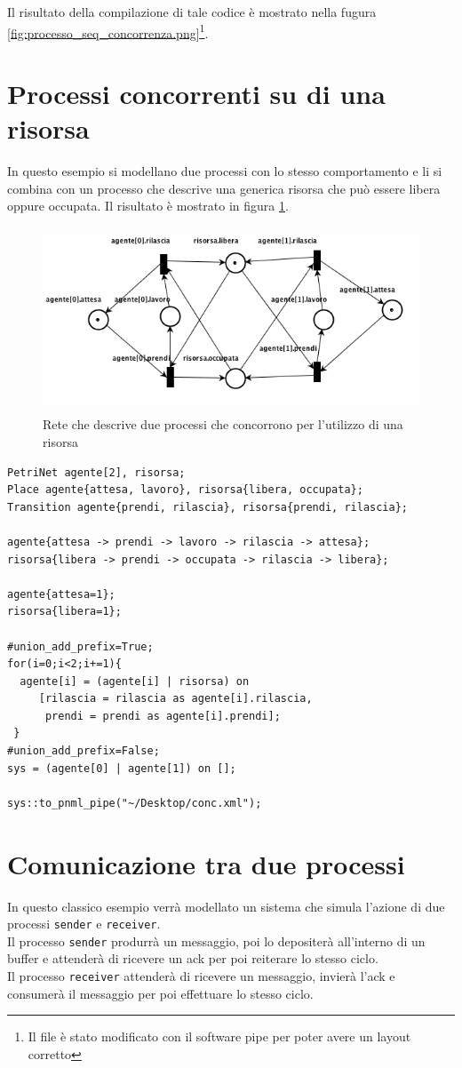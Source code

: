 \documentclass[italian,12pt]{book}
\begin{document}
Il risultato della compilazione di tale codice è mostrato nella fugura \ref{fig:processo_seq_concorrenza.png}\footnote{Il file è stato modificato con il software pipe per poter avere un layout corretto}.

\section{Processi concorrenti su di una risorsa}
In questo esempio si modellano due processi con lo stesso comportamento e li si combina con un processo che descrive una generica risorsa che può essere libera oppure occupata. Il risultato è mostrato in figura \ref{fig:processi_concorrenti_su_risorsa.png}.
\begin{figure}[htb]
\centerline{\includegraphics[height=5.5cm]{img/processi_concorrenti_su_risorsa.png}}
\caption{Rete che descrive due processi che concorrono per l'utilizzo di una risorsa}\label{fig:processi_concorrenti_su_risorsa.png}
\end{figure}

\begin{verbatim}PetriNet agente[2], risorsa;
Place agente{attesa, lavoro}, risorsa{libera, occupata};
Transition agente{prendi, rilascia}, risorsa{prendi, rilascia};

agente{attesa -> prendi -> lavoro -> rilascia -> attesa};
risorsa{libera -> prendi -> occupata -> rilascia -> libera};

agente{attesa=1};
risorsa{libera=1};

#union_add_prefix=True;
for(i=0;i<2;i+=1){
  agente[i] = (agente[i] | risorsa) on 
     [rilascia = rilascia as agente[i].rilascia, 
      prendi = prendi as agente[i].prendi];
 }
#union_add_prefix=False;
sys = (agente[0] | agente[1]) on [];

sys::to_pnml_pipe("~/Desktop/conc.xml");
\end{verbatim}

\section{Comunicazione tra due processi}
In questo classico esempio verrà modellato un sistema che simula l'azione di due processi {\tt sender} e {\tt receiver}.\\
Il processo {\tt sender} produrrà un messaggio, poi lo depositerà all'interno di un buffer e attenderà di ricevere un ack per poi reiterare lo stesso ciclo.\\
Il processo {\tt receiver} attenderà di ricevere un messaggio, invierà l'ack e consumerà il messaggio per poi effettuare lo stesso ciclo.\\
\end{document}
